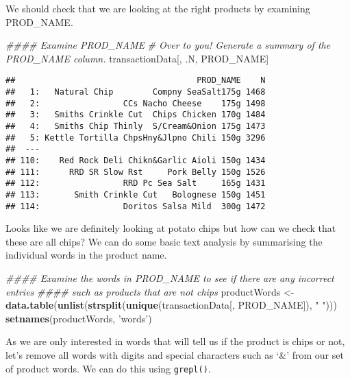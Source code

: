 \documentclass[]{article}
\newenvironment{Shaded}{\begin{snugshade}}{\end{snugshade}}
\newcommand{\CommentTok}[1]{\textcolor[rgb]{0.56,0.35,0.01}{\textit{#1}}}
\newcommand{\KeywordTok}[1]{\textcolor[rgb]{0.13,0.29,0.53}{\textbf{#1}}}
\newcommand{\NormalTok}[1]{#1}
\newcommand{\StringTok}[1]{\textcolor[rgb]{0.31,0.60,0.02}{#1}}
\begin{document}
We should check that we are looking at the right products by examining
PROD\_NAME.

\begin{Shaded}
\begin{Highlighting}[]
\CommentTok{#### Examine PROD_NAME}
\CommentTok{# Over to you! Generate a summary of the PROD_NAME column.}
\NormalTok{transactionData[, .N, PROD_NAME]}
\end{Highlighting}
\end{Shaded}

\begin{verbatim}
##                                     PROD_NAME    N
##   1:   Natural Chip        Compny SeaSalt175g 1468
##   2:                 CCs Nacho Cheese    175g 1498
##   3:   Smiths Crinkle Cut  Chips Chicken 170g 1484
##   4:   Smiths Chip Thinly  S/Cream&Onion 175g 1473
##   5: Kettle Tortilla ChpsHny&Jlpno Chili 150g 3296
##  ---                                              
## 110:    Red Rock Deli Chikn&Garlic Aioli 150g 1434
## 111:      RRD SR Slow Rst     Pork Belly 150g 1526
## 112:                 RRD Pc Sea Salt     165g 1431
## 113:       Smith Crinkle Cut   Bolognese 150g 1451
## 114:                 Doritos Salsa Mild  300g 1472
\end{verbatim}

Looks like we are definitely looking at potato chips but how can we
check that these are all chips? We can do some basic text analysis by
summarising the individual words in the product name.

\begin{Shaded}
\begin{Highlighting}[]
\CommentTok{#### Examine the words in PROD_NAME to see if there are any incorrect entries}
\CommentTok{#### such as products that are not chips}
\NormalTok{productWords <-}\StringTok{ }\KeywordTok{data.table}\NormalTok{(}\KeywordTok{unlist}\NormalTok{(}\KeywordTok{strsplit}\NormalTok{(}\KeywordTok{unique}\NormalTok{(transactionData[, PROD_NAME]), }\StringTok{" "}\NormalTok{)))}
\KeywordTok{setnames}\NormalTok{(productWords, }\StringTok{'words'}\NormalTok{)}
\end{Highlighting}
\end{Shaded}

As we are only interested in words that will tell us if the product is
chips or not, let's remove all words with digits and special characters
such as `\&' from our set of product words. We can do this using
\texttt{grepl()}.
\end{document}
